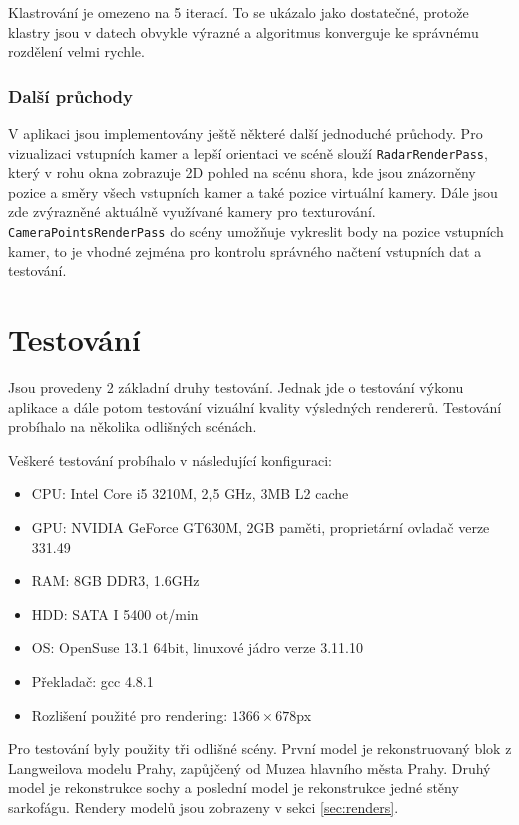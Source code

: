 \documentclass[11pt,twoside,a4paper]{book}
\begin{document}
Klastrování je omezeno na 5 iterací. To se ukázalo jako dostatečné, protože klastry jsou v datech obvykle výrazné a algoritmus konverguje ke správnému rozdělení velmi rychle.

\subsection{Další průchody}

V aplikaci jsou implementovány ještě některé další jednoduché průchody. Pro vizualizaci vstupních kamer a lepší orientaci ve scéně slouží \texttt{RadarRenderPass}, který v rohu okna zobrazuje 2D pohled na scénu shora, kde jsou znázorněny pozice a směry všech vstupních kamer a také pozice virtuální kamery. Dále jsou zde zvýrazněné aktuálně využívané kamery pro texturování. \texttt{CameraPointsRenderPass} do scény umožňuje vykreslit body na pozice vstupních kamer, to je vhodné zejména pro kontrolu správného načtení vstupních dat a testování.

\chapter{Testování}
\label{chap:testing}

Jsou provedeny 2 základní druhy testování. Jednak jde o testování výkonu aplikace a dále potom testování vizuální kvality výsledných rendererů. Testování probíhalo na několika odlišných scénách.

Veškeré testování probíhalo v následující konfiguraci:
\begin{itemize}
\item CPU:  Intel Core i5 3210M,  2,5 GHz, 3MB L2 cache
\item GPU:  NVIDIA GeForce GT630M, 2GB paměti, proprietární ovladač verze 331.49
\item RAM: 8GB  DDR3, 1.6GHz
\item HDD: SATA I 5400 ot/min
\item OS: OpenSuse 13.1 64bit, linuxové jádro verze 3.11.10
\item Překladač: gcc 4.8.1
\item Rozlišení použité pro rendering: $1366\times678$px
\end{itemize}

Pro testování byly použity tři odlišné scény. První model je rekonstruovaný blok z Langweilova modelu Prahy\cite{langweil}, zapůjčený od Muzea hlavního města Prahy.  Druhý model je rekonstrukce sochy a poslední model je rekonstrukce jedné stěny sarkofágu. Rendery modelů jsou zobrazeny v sekci  \ref{sec:renders}.
\end{document}
